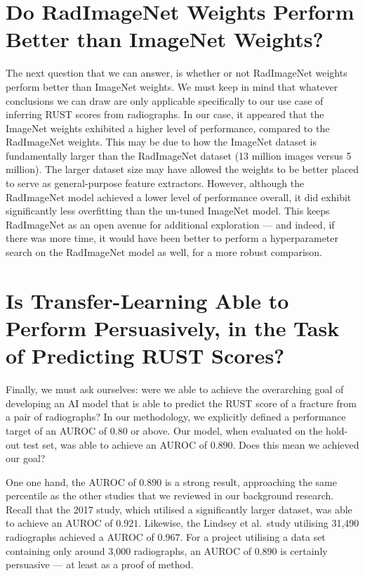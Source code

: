 \section{Do RadImageNet Weights Perform Better than ImageNet Weights?}

The next question that we can answer, is whether or not RadImageNet weights perform better than ImageNet weights. We must keep in mind that whatever conclusions we can draw are only applicable specifically to our use case of inferring RUST scores from radiographs. In our case, it appeared that the ImageNet weights exhibited a higher level of performance, compared to the RadImageNet weights. This may be due to how the ImageNet dataset is fundamentally larger than the RadImageNet dataset (13 million images versus 5 million). The larger dataset size may have allowed the weights to be better placed to serve as general-purpose feature extractors. However, although the RadImageNet model achieved a lower level of performance overall, it did exhibit significantly less overfitting than the un-tuned ImageNet model. This keeps RadImageNet as an open avenue for additional exploration --- and indeed, if there was more time, it would have been better to perform a hyperparameter search on the RadImageNet model as well, for a more robust comparison.

\section{Is Transfer-Learning Able to Perform Persuasively, in the Task of Predicting RUST Scores?}

Finally, we must ask ourselves: were we able to achieve the overarching goal of developing an AI model that is able to predict the RUST score of a fracture from a pair of radiographs? In our methodology, we explicitly defined a performance target of an AUROC of \(0.80\) or above. Our model, when evaluated on the hold-out test set, was able to achieve an AUROC of \(0.890\). Does this mean we achieved our goal?

One one hand, the AUROC of \(0.890\) is a strong result, approaching the same percentile as the other studies that we reviewed in our background research. Recall that the 2017 \autocite{MURA2017} study, which utilised a significantly larger dataset, was able to achieve an AUROC of \(0.921\). Likewise, the Lindsey et al.\ study utilising 31,490 radiographs achieved a AUROC of \(0.967\). \autocite{Lindsey2018} For a project utilising a data set containing only around 3,000 radiographs, an AUROC of \(0.890\) is certainly persuasive --- at least as a proof of method.

